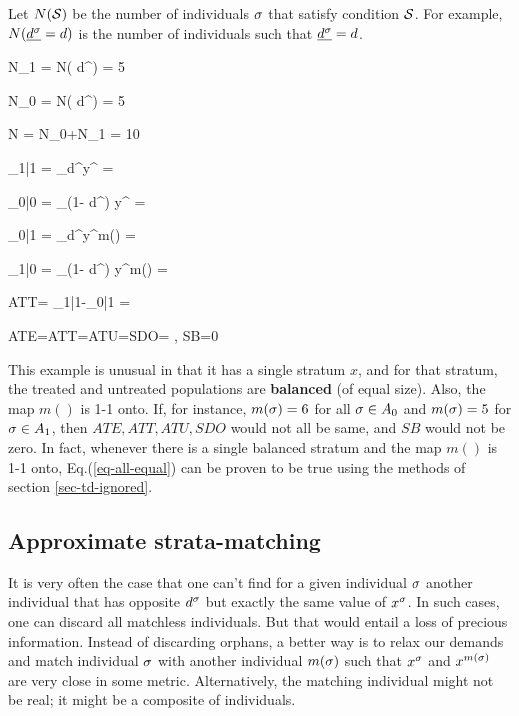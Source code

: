 Let $N({\cal S})$
be the number of individuals $\sigma$
that satisfy condition ${\cal S}$.
For example, 
$N(\underline{ d^\sigma}= d)$
is the number of individuals
such that $\underline{ d^\sigma}= d$.

\beq
N_1
=
N( d^)
=
5
\eeq

\beq
N_0
=
N( d^)
=
5
\eeq

\beq
N
= N_0+N_1
=
10
\eeq



\beq
\caly_{1|1}
=
\sum_\s  d^\s y^\s
=
\eeq

\beq
\caly_{0|0}
=
\sum_\s (1- d^\s) y^\s
=
\eeq

\beq
\caly_{0|1}
=
\sum_\s  d^\s y^{m(\s)}
=
\eeq

\beq
\caly_{1|0}
=
\sum_\s (1- d^\s) y^{m(\s)}
=
\eeq

\beq
ATT=
\caly_{1|1}-\caly_{0|1}
=
\eeq

\beq
ATE=ATT=ATU=SDO=
\;,\;\; SB=0
\label{eq-all-equal}
\eeq

This example is unusual
in that it has a single
stratum $x$, and for
that stratum, 
the treated and 
untreated populations
are {\bf balanced} (of equal size).
Also, the map $m()$
is 1-1 onto.
If, for instance,
$m(\sigma)=6$ for all $\sigma\in A_0$
and $m(\sigma)=5$ for $\sigma\in A_1$,
then $ATE, ATT, ATU, SDO$
would not all be same, and 
$SB$ would not be zero.  
In fact, whenever there is a single
balanced stratum and the map $m()$
is 1-1 onto, Eq.(\ref{eq-all-equal})
can be proven to be true using
the methods of
section \ref{sec-td-ignored}.



\subsection{Approximate   strata-matching}

It is very often
the case that
one can't
find for a given
individual $\sigma$
another individual that has
opposite $ d^\sigma$ but
exactly the same value of $x^\sigma$.
In such cases, one can discard all
matchless individuals.
But that would entail a loss 
of precious information.
Instead of discarding orphans, 
a better way is to
relax our demands and
match individual $\sigma$
with another individual $m(\sigma)$
such that $x^\sigma$
and $x^{m(\sigma)}$ are very
close in some metric.
Alternatively, the matching
individual might 
not be real; it might
be a composite
of individuals.

